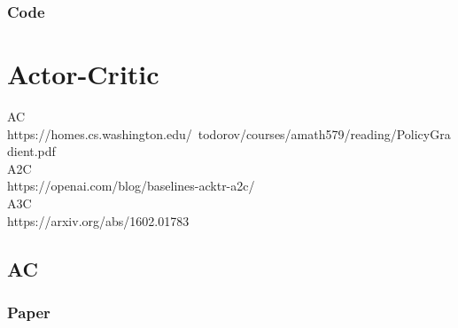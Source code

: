 \documentclass{book}
\begin{document}
\subsection{Code}
\chapter{Actor-Critic} 
AC\\
https://homes.cs.washington.edu/~todorov/courses/amath579/reading/PolicyGradient.pdf\\
A2C\\
https://openai.com/blog/baselines-acktr-a2c/\\
A3C\\
https://arxiv.org/abs/1602.01783
\section{AC}
\subsection{Paper}
\end{document}
